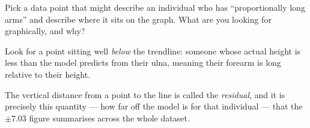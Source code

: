 \documentclass[12pt]{ximera}
\begin{document}
\begin{problem}
Pick a data point that might describe an individual who has ``proportionally long arms''
and describe where it sits on the graph. What are you looking for graphically, and why?

\begin{freeResponse}
\end{freeResponse}

\begin{solution}
Look for a point sitting well \emph{below} the trendline: someone whose actual height is
less than the model predicts from their ulna, meaning their forearm is long relative to
their height.

The vertical distance from a point to the line is called the \emph{residual}, and it is
precisely this quantity --- how far off the model is for that individual --- that the
$\pm 7.03$ figure summarises across the whole dataset.
\end{solution}
\end{problem}
\end{document}
